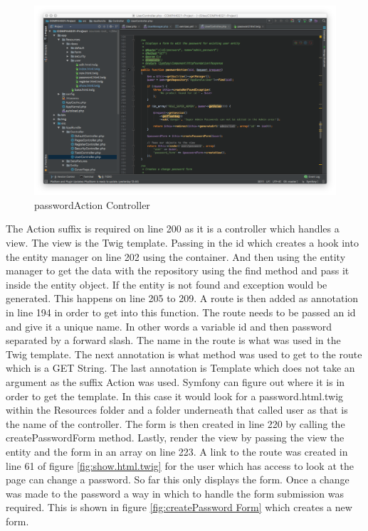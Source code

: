\begin{figure}[htbp]
   \centering
   \includegraphics[width=400pt]{figures/password_action.png} %
   \caption{passwordAction Controller}
   \label{fig:passwordAction Controller}
\end{figure}

The Action suffix is required on line 200 as it is a controller which handles a view. The view is the Twig template. Passing in the id which creates a hook into the entity manager on line 202 using the container. And then using the entity manager to get the data with the repository using the find method and pass it inside the entity object. If the entity is not found and exception would be generated. This happens on line 205 to 209. A route is then added as annotation in line 194 in order to get into this function. The route needs to be passed an id and give it a unique name. In other words a variable id and then password separated by a forward slash. The name in the route is what was used in the Twig template. The next annotation is what method was used to get to the route which is a GET String. The last annotation is Template which does not take an argument as the suffix Action was used. Symfony can figure out where it is in order to get the template. In this case it would look for a password.html.twig within the Resources folder and a folder underneath that called user as that is the name of the controller. The form is then created in line 220 by calling the createPasswordForm method. Lastly, render the view by passing the view the entity and the form in an array on line 223. A link to the route was created in line 61 of figure \ref{fig:show.html.twig} for the user which has access to look at the page can change a password. So far this only displays the form. Once a change was made to the password a way in which to handle the form submission was required. This is shown in figure \ref{fig:createPassword Form} which creates a new form.

